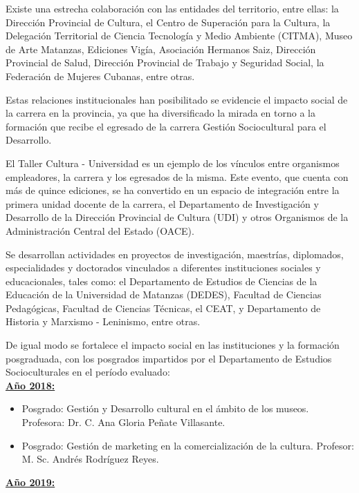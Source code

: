 Existe una estrecha colaboración con las entidades del territorio, entre ellas: la Dirección Provincial de Cultura, el Centro de Superación para la Cultura, la Delegación Territorial de Ciencia Tecnología y Medio Ambiente (CITMA), Museo de Arte Matanzas, Ediciones Vigía, Asociación Hermanos Saiz, Dirección Provincial de Salud, Dirección Provincial de Trabajo y Seguridad Social, la Federación de Mujeres Cubanas, entre otras.

Estas relaciones institucionales han posibilitado se evidencie el impacto social de la carrera en la provincia, ya que ha diversificado la mirada en torno a la formación que recibe el egresado de la carrera Gestión Sociocultural para el Desarrollo.

El Taller Cultura - Universidad es un ejemplo de los vínculos entre organismos empleadores, la carrera y los egresados de la misma. Este evento, que cuenta con más de quince ediciones, se ha convertido en un espacio de integración entre la primera unidad docente de la carrera, el Departamento de Investigación y Desarrollo de la Dirección Provincial de Cultura (UDI) y otros Organismos de la Administración Central del Estado (OACE).

Se desarrollan actividades en proyectos de investigación, maestrías, diplomados, especialidades y doctorados vinculados a diferentes instituciones sociales y educacionales, tales como: el Departamento de Estudios de Ciencias de la Educación de la Universidad de Matanzas (DEDES), Facultad de Ciencias Pedagógicas, Facultad de Ciencias Técnicas, el CEAT, y Departamento de Historia y Marxismo - Leninismo, entre otras.

De igual modo se fortalece el impacto social en las instituciones y la formación posgraduada, con los posgrados impartidos por el Departamento de Estudios Socioculturales en el período evaluado:\\

\underline{\textbf{Año 2018:}}

\begin{itemize}
	\setlength\itemsep{-0.5em}
	\item Posgrado: Gestión y Desarrollo cultural en el ámbito de los museos. Profesora: Dr. C. Ana Gloria Peñate Villasante.
	\item Posgrado: Gestión de marketing en la comercialización de la cultura. Profesor: M. Sc. Andrés Rodríguez Reyes.
\end{itemize}

\underline{\textbf{Año 2019:}}

